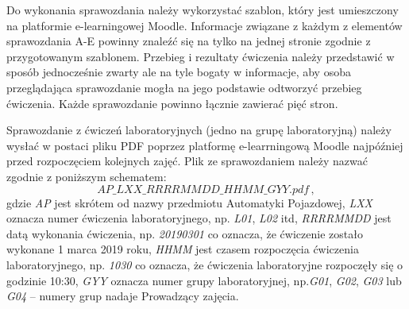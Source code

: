 \documentclass[11pt,onecolumn]{article}
\begin{document}
Do wykonania sprawozdania należy wykorzystać szablon, który jest umieszczony na platformie e-learningowej Moodle. Informacje związane z każdym z elementów sprawozdania A-E powinny znaleźć się na tylko na jednej stronie zgodnie z przygotowanym szablonem. Przebieg i rezultaty ćwiczenia należy przedstawić w sposób jednocześnie zwarty ale na tyle bogaty w informacje, aby osoba przeglądająca sprawozdanie mogła na jego podstawie odtworzyć przebieg ćwiczenia. Każde sprawozdanie powinno łącznie zawierać pięć stron.

Sprawozdanie z ćwiczeń laboratoryjnych (jedno na grupę laboratoryjną) należy wysłać w postaci pliku PDF poprzez platformę e-learrningową Moodle najpóźniej przed rozpoczęciem kolejnych zajęć.
Plik ze sprawozdaniem należy nazwać zgodnie z poniższym schematem: 
\begin{equation} \label{equ:nazwa_spr}
 AP\_LXX\_RRRRMMDD\_HHMM\_GYY.pdf\,,
\end{equation}
gdzie \emph{AP} jest skrótem od nazwy przedmiotu Automatyki Pojazdowej, \emph{LXX} oznacza numer ćwiczenia laboratoryjnego, np. \emph{L01}, \emph{L02} itd, \emph{RRRRMMDD} jest datą wykonania ćwiczenia, np. \emph{20190301} co oznacza, że ćwiczenie zostało wykonane 1 marca 2019 roku, \emph{HHMM} jest czasem rozpoczęcia ćwiczenia laboratoryjnego, np. \emph{1030} co oznacza, że ćwiczenia laboratoryjne rozpoczęły się o godzinie 10:30, \emph{GYY} oznacza numer grupy laboratoryjnej, np.\emph{G01}, \emph{G02}, \emph{G03} lub \emph{G04} – numery grup nadaje Prowadzący zajęcia.
%
\end{document}
